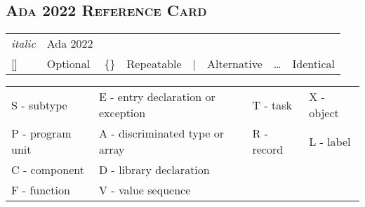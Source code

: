 \documentclass[english]{article}
\begin{document}
\begin{scriptsize}
\begin{multicols*}{3}
\section*{\textsc{Ada 2022 Reference Card}}
\begin{tabular}{@{}l l l l l l l l}
\textit{italic} & Ada 2022 &&&&&&\\
{[]} & Optional & \{\} & Repeatable & | & Alternative & \dots & Identical\\
\end{tabular}
\newline
\smallskip
\newline
\begin{tabular}{@{}l l l l}
   S - subtype & E - entry declaration or exception & T - task & X - object\\
   P - program unit & A - discriminated type or array & R - record & L - label\\
   C - component & D - library declaration &&\\
   F - function & V - value sequence &&\\
\end{tabular}

\end{multicols*}
\end{scriptsize}
\end{document}
